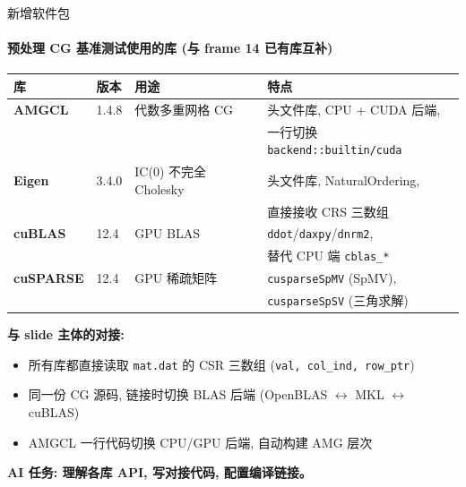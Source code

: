 \documentclass[12pt,aspectratio=169]{beamer}
\begin{document}
\begin{frame}[shrink]{新增软件包}
\framesubtitle{预处理 CG 基准测试使用的库 (与 frame 14 已有库互补)}

\footnotesize
\begin{center}
\renewcommand{\arraystretch}{1.25}
\setlength{\tabcolsep}{4pt}
\begin{tabular}{@{}l l l l@{}}
\toprule
\textbf{库} & \textbf{版本} & \textbf{用途} & \textbf{特点} \\
\midrule
\textbf{AMGCL} & 1.4.8 & 代数多重网格 CG & 头文件库, CPU + CUDA 后端, \\
            &       &                   & 一行切换 \texttt{backend::builtin/cuda} \\
\textbf{Eigen} & 3.4.0 & IC(0) 不完全 Cholesky & 头文件库, NaturalOrdering, \\
            &       &                      & 直接接收 CRS 三数组 \\
\textbf{cuBLAS} & 12.4 & GPU BLAS & \texttt{ddot}/\texttt{daxpy}/\texttt{dnrm2}, \\
            &       &           & 替代 CPU 端 \texttt{cblas\_*} \\
\textbf{cuSPARSE}& 12.4 & GPU 稀疏矩阵 & \texttt{cusparseSpMV} (SpMV), \\
            &       &               & \texttt{cusparseSpSV} (三角求解) \\
\bottomrule
\end{tabular}
\end{center}
\normalsize

\vspace{4pt}
\small
\textbf{与 slide 主体的对接:}
\begin{itemize}\itemsep0pt
  \item 所有库都直接读取 \texttt{mat.dat} 的 CSR 三数组 (\texttt{val, col\_ind, row\_ptr})
  \item 同一份 CG 源码, 链接时切换 BLAS 后端 (OpenBLAS $\leftrightarrow$ MKL $\leftrightarrow$ cuBLAS)
  \item AMGCL 一行代码切换 CPU/GPU 后端, 自动构建 AMG 层次
\end{itemize}

\vspace{2pt}
\begin{center}
\small \textbf{AI 任务: 理解各库 API, 写对接代码, 配置编译链接。}
\end{center}
\end{frame}
\end{document}
